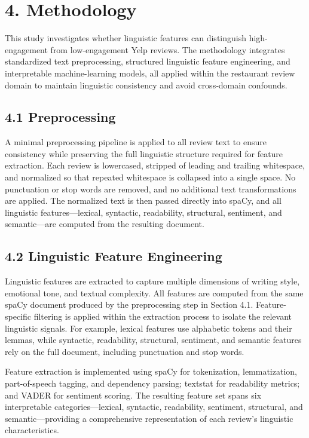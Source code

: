 \hypertarget{methodology}{%
\section{4. Methodology}\label{methodology}}

This study investigates whether linguistic features can distinguish
high-engagement from low-engagement Yelp reviews. The methodology
integrates standardized text preprocessing, structured linguistic
feature engineering, and interpretable machine-learning models, all
applied within the restaurant review domain to maintain linguistic
consistency and avoid cross‑domain confounds.

\hypertarget{preprocessing}{%
\subsection{4.1 Preprocessing}\label{preprocessing}}

A minimal preprocessing pipeline is applied to all review text to ensure
consistency while preserving the full linguistic structure required for
feature extraction. Each review is lowercased, stripped of leading and
trailing whitespace, and normalized so that repeated whitespace is
collapsed into a single space. No punctuation or stop words are removed,
and no additional text transformations are applied. The normalized text
is then passed directly into spaCy, and all linguistic
features---lexical, syntactic, readability, structural, sentiment, and
semantic---are computed from the resulting document.

\hypertarget{linguistic-feature-engineering}{%
\subsection{4.2 Linguistic Feature
Engineering}\label{linguistic-feature-engineering}}

Linguistic features are extracted to capture multiple dimensions of
writing style, emotional tone, and textual complexity. All features are
computed from the same spaCy document produced by the preprocessing step
in Section 4.1. Feature-specific filtering is applied within the
extraction process to isolate the relevant linguistic signals. For
example, lexical features use alphabetic tokens and their lemmas, while
syntactic, readability, structural, sentiment, and semantic features
rely on the full document, including punctuation and stop words.

Feature extraction is implemented using spaCy for tokenization,
lemmatization, part-of-speech tagging, and dependency parsing; textstat
for readability metrics; and VADER for sentiment scoring. The resulting
feature set spans six interpretable categories---lexical, syntactic,
readability, sentiment, structural, and semantic---providing a
comprehensive representation of each review's linguistic
characteristics.

